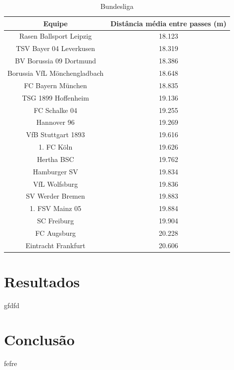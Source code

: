 \documentclass{article}
\begin{document}

\begin{table}[H]
    \centering
    \begin{tabular}{|c|c|}
        \hline
        \textbf{Equipe}              & \textbf{Distância média entre passes
        (m)}                                                                \\
        \hline
        Rasen Ballsport Leipzig      & 18.123
        \\ \hline
        TSV Bayer 04 Leverkusen      & 18.319
        \\ \hline
        BV Borussia 09 Dortmund      & 18.386
        \\ \hline
        Borussia VfL Mönchengladbach & 18.648
        \\ \hline
        FC Bayern München            & 18.835
        \\ \hline
        TSG 1899 Hoffenheim          & 19.136
        \\ \hline
        FC Schalke 04                & 19.255
        \\ \hline
        Hannover 96                  & 19.269
        \\ \hline
        VfB Stuttgart 1893           & 19.616
        \\ \hline
        1. FC Köln                   & 19.626
        \\ \hline
        Hertha BSC                   & 19.762
        \\ \hline
        Hamburger SV                 & 19.834
        \\ \hline
        VfL Wolfsburg                & 19.836
        \\ \hline
        SV Werder Bremen             & 19.883
        \\ \hline
        1. FSV Mainz 05              & 19.884
        \\ \hline
        SC Freiburg                  & 19.904
        \\ \hline
        FC Augsburg                  & 20.228
        \\ \hline
        Eintracht Frankfurt          & 20.606
        \\ \hline
    \end{tabular}
    \caption{Bundesliga}
    \label{tab:average_distance_germany}
\end{table}

\section{Resultados}

gfdfd

\section{Conclusão}

fefre

\newpage

\renewcommand{\refname}{Referências Bibliográficas}

\nocite{*}
\end{document}
